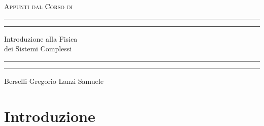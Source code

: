 \documentclass[12pt, a4paper]{book}
\theoremstyle{theorem}
\begin{document}
	\begin{titlepage}
		\centering %
		\scshape %
		Appunti dal Corso di
		\vspace*{1.5\baselineskip} %
		
		
		
		\rule{13cm}{1.6pt}\vspace*{-\baselineskip}\vspace*{2pt} %
		\rule{13cm}{0.4pt} %
		
		\vspace{0.75\baselineskip} %
		{ \Huge Introduzione alla Fisica\\
		\vspace{4mm}
		dei Sistemi Complessi \\ }
		\vspace{0.75\baselineskip} %
		\rule{13cm}{0.4pt}\vspace*{-\baselineskip}\vspace{3.2pt} %
		\rule{13cm}{1.6pt} %
		
		\vspace{1.75\baselineskip} %
		{}
		Berselli Gregorio \quad Lanzi Samuele
		\vfill
	\end{titlepage}
	\tableofcontents
	\chapter{Introduzione} %
\end{document}
